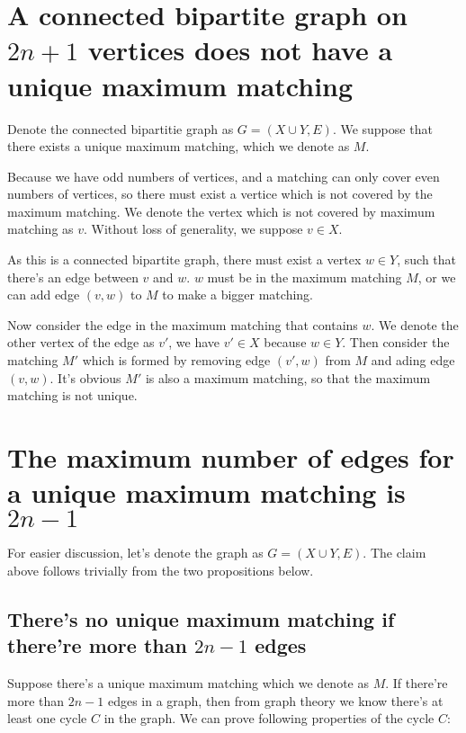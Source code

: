 
\section{A connected bipartite graph on $2n+1$ vertices does not have a unique maximum matching}

Denote the connected bipartitie graph as $G = (X \cup Y, E)$. We suppose that there exists a unique maximum matching, which we denote as $M$.

Because we have odd numbers of vertices, and a matching can only cover even numbers of vertices, so there must exist a vertice which is not covered by the maximum matching. We denote the vertex which is not covered by maximum matching as $v$. Without loss of generality, we suppose $v \in X$.

As this is a connected bipartite graph, there must exist a vertex $w \in Y$, such that there's an edge between $v$ and $w$. $w$ must be in the maximum matching $M$, or we can add edge $(v,w)$ to $M$ to make a bigger matching.

Now consider the edge in the maximum matching that contains $w$. We denote the other vertex of the edge as $v'$,  we have $v' \in X$ because $w \in Y$. Then consider the matching $M'$ which is formed by removing edge $(v',w)$ from $M$ and ading edge $(v, w)$. It's obvious $M'$ is also a maximum matching, so that the maximum matching is not unique.

\section{The maximum number of edges for a unique maximum matching is $2n-1$}

For easier discussion, let's denote the graph as $G = (X \cup Y, E)$. The claim above follows trivially from the two propositions below.

\subsection{There's no unique maximum matching if there're more than $2n-1$ edges}

Suppose there's a unique maximum matching which we denote as $M$. If there're more than $2n-1$ edges in a graph, then from graph theory we know there's at least one cycle $C$ in the graph. We can prove following properties of the cycle $C$:

